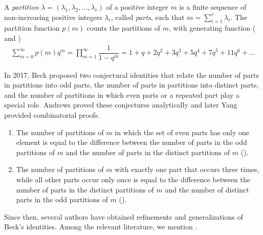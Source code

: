 \documentclass[reqno,12pt]{amsart}
\theoremstyle{definition}
\begin{document}
A \emph{partition} $\lambda = (\lambda_1, \lambda_2, \dots, \lambda_r)$ of a positive integer $m$ is a finite sequence of non-increasing positive integers $\lambda_i$, called \emph{parts}, such that $m = \sum_{i=1}^r \lambda_i$. The partition function $p(m)$ counts the partitions of $m$, with generating function (\cite{Andrews98} and \cite[A000041]{OEIS}) 
\begin{align}\label{pgf}
\sum_{m=0}^{\infty} p(m)q^m = \prod_{m=1}^{\infty} \dfrac{1}{1-q^m}
=1+q+2q^2+3q^3+5q^4+7q^5+ 11q^6+\dots
\end{align}

In 2017, Beck proposed two conjectural identities that relate the number of parts in partitions into odd parts, the number of parts in partitions into distinct parts, and the number of partitions in which even parts or a repeated part play a special role. Andrews \cite{Andrews17} proved these conjectures analytically and later Yang \cite{Yang19}
provided combinatorial proofs.

\begin{enumerate}

\item[i)] The number of partitions of $m$ in which the set of even parts has only one element is equal to the difference between the number of parts in the odd partitions of $m$ and the number of parts in the distinct partitions of $m$ (\cite[A090867]{OEIS}).

\item[ii)] The number of partitions of $m$  with exactly one part that occurs three times, while all other parts occur only once is equal to the difference between the number of parts in the distinct partitions of $m$ and the number of distinct parts in the odd partitions of $m$ (\cite[A265251]{OEIS}).

\end{enumerate}

Since then, several authors have obtained refinements and generalizations of Beck's identities. Among the relevant literature, we mention \cite{FuTang17,Yang19,BW21, BW23}.
\end{document}
